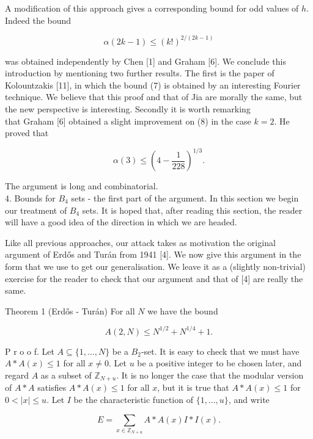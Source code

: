 \documentclass[10pt]{article}
\begin{document}
A modification of this approach gives a corresponding bound for odd values of $h$. Indeed the bound


\begin{equation*}
\alpha(2 k-1) \leq(k!)^{2 /(2 k-1)} \tag{8}
\end{equation*}


was obtained independently by Chen [1] and Graham [6]. We conclude this introduction by mentioning two further results. The first is the paper of Kolountzakis [11], in which the bound (7) is obtained by an interesting Fourier technique. We believe that this proof and that of Jia are morally the same, but the new perspective is interesting. Secondly it is worth remarking\\[0pt]
that Graham [6] obtained a slight improvement on (8) in the case $k=2$. He proved that


\begin{equation*}
\alpha(3) \leq\left(4-\frac{1}{228}\right)^{1 / 3} . \tag{9}
\end{equation*}


The argument is long and combinatorial.\\
4. Bounds for $B_{4}$ sets - the first part of the argument. In this section we begin our treatment of $B_{4}$ sets. It is hoped that, after reading this section, the reader will have a good idea of the direction in which we are headed.

Like all previous approaches, our attack takes as motivation the original argument of Erdős and Turán from 1941 [4]. We now give this argument in the form that we use to get our generalisation. We leave it as a (slightly non-trivial) exercise for the reader to check that our argument and that of [4] are really the same.

Theorem 1 (Erdős - Turán) For all $N$ we have the bound

$$
A(2, N) \leq N^{1 / 2}+N^{1 / 4}+1 .
$$

P r o o f. Let $A \subseteq\{1, \ldots, N\}$ be a $B_{2}$-set. It is easy to check that we must have $A * A(x) \leq 1$ for all $x \neq 0$. Let $u$ be a positive integer to be chosen later, and regard $A$ as a subset of $\mathbb{Z}_{N+u}$. It is no longer the case that the modular version of $A * A$ satisfies $A * A(x) \leq 1$ for all $x$, but it is true that $A * A(x) \leq 1$ for $0<|x| \leq u$. Let $I$ be the characteristic function of $\{1, \ldots, u\}$, and write

$$
E=\sum_{x \in \mathbb{Z}_{N+u}} A * A(x) I * I(x) .
$$
\end{document}
